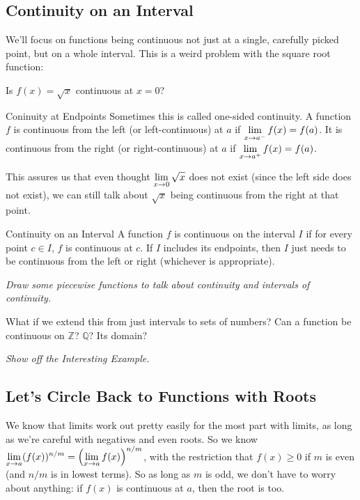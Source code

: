 \subsection*{Continuity on an Interval}

We'll focus on functions being continuous not just at a single, carefully picked point, but on a whole interval.
This is a weird problem with the square root function:

Is $f(x) = \sqrt{x}$ continuous at $x=0$?

\begin{defn}{Coninuity at Endpoints}
  Sometimes this is called one-sided continuity.
  A function $f$ is continuous from the left (or left-continuous) at $a$ if $\displaystyle \lim_{x\to a^-}f(x) = f(a)$.
  It is continuous from the right (or right-continuous) at $a$ if $\displaystyle \lim_{x\to a^+}f(x) = f(a)$.
\end{defn}

This assures us that even thought $\displaystyle \lim_{x\to 0}\sqrt{x}$ does not exist (since the left side does not exist), we can still talk about $\sqrt{x}$ being continuous from the right at that point.

\begin{defn}{Continuity on an Interval}
  A function $f$ is continuous on the interval $I$ if for every point $c\in I$, $f$ is continuous at $c$.
  If $I$ includes its endpoints, then $I$ just needs to be continuous from the left or right (whichever is appropriate).
\end{defn}

\textit{Draw some piecewise functions to talk about continuity and intervals of continuity.}

What if we extend this from just intervals to sets of numbers?
Can a function be continuous on $\mathbb{Z}$? $\mathbb{Q}$? Its domain?

\textit{Show off the Interesting Example.}

\subsection*{Let's Circle Back to Functions with Roots}

We know that limits work out pretty easily for the most part with limits, as long as we're careful with negatives and even roots.
So we know $\displaystyle \lim_{x\to a} (f(x))^{n/m} = \left(\displaystyle \lim_{x\to a}f(x)\right)^{n/m}$, with the restriction that $f(x)\geq 0$ if $m$ is even (and $n/m$ is in lowest terms).
So as long as $m$ is odd, we don't have to worry about anything: if $f(x)$ is continuous at $a$, then the root is too.

